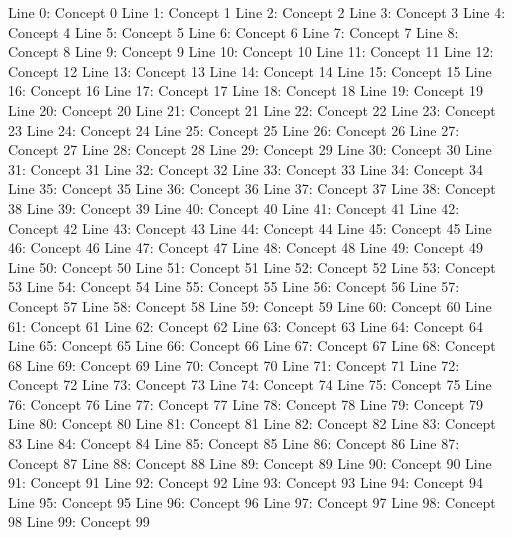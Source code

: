 Line 0: Concept 0
Line 1: Concept 1
Line 2: Concept 2
Line 3: Concept 3
Line 4: Concept 4
Line 5: Concept 5
Line 6: Concept 6
Line 7: Concept 7
Line 8: Concept 8
Line 9: Concept 9
Line 10: Concept 10
Line 11: Concept 11
Line 12: Concept 12
Line 13: Concept 13
Line 14: Concept 14
Line 15: Concept 15
Line 16: Concept 16
Line 17: Concept 17
Line 18: Concept 18
Line 19: Concept 19
Line 20: Concept 20
Line 21: Concept 21
Line 22: Concept 22
Line 23: Concept 23
Line 24: Concept 24
Line 25: Concept 25
Line 26: Concept 26
Line 27: Concept 27
Line 28: Concept 28
Line 29: Concept 29
Line 30: Concept 30
Line 31: Concept 31
Line 32: Concept 32
Line 33: Concept 33
Line 34: Concept 34
Line 35: Concept 35
Line 36: Concept 36
Line 37: Concept 37
Line 38: Concept 38
Line 39: Concept 39
Line 40: Concept 40
Line 41: Concept 41
Line 42: Concept 42
Line 43: Concept 43
Line 44: Concept 44
Line 45: Concept 45
Line 46: Concept 46
Line 47: Concept 47
Line 48: Concept 48
Line 49: Concept 49
Line 50: Concept 50
Line 51: Concept 51
Line 52: Concept 52
Line 53: Concept 53
Line 54: Concept 54
Line 55: Concept 55
Line 56: Concept 56
Line 57: Concept 57
Line 58: Concept 58
Line 59: Concept 59
Line 60: Concept 60
Line 61: Concept 61
Line 62: Concept 62
Line 63: Concept 63
Line 64: Concept 64
Line 65: Concept 65
Line 66: Concept 66
Line 67: Concept 67
Line 68: Concept 68
Line 69: Concept 69
Line 70: Concept 70
Line 71: Concept 71
Line 72: Concept 72
Line 73: Concept 73
Line 74: Concept 74
Line 75: Concept 75
Line 76: Concept 76
Line 77: Concept 77
Line 78: Concept 78
Line 79: Concept 79
Line 80: Concept 80
Line 81: Concept 81
Line 82: Concept 82
Line 83: Concept 83
Line 84: Concept 84
Line 85: Concept 85
Line 86: Concept 86
Line 87: Concept 87
Line 88: Concept 88
Line 89: Concept 89
Line 90: Concept 90
Line 91: Concept 91
Line 92: Concept 92
Line 93: Concept 93
Line 94: Concept 94
Line 95: Concept 95
Line 96: Concept 96
Line 97: Concept 97
Line 98: Concept 98
Line 99: Concept 99
